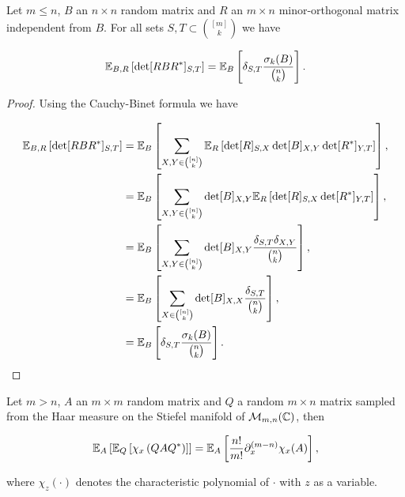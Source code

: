 \begin{lemma} \label{lemma:conjugate_minorth}
    Let $m \le n$, $B$ an $n\times n$ random matrix and $R$ an $m\times n$ minor-orthogonal matrix independent from $B$. For all sets $S,T \subset \binom{[m]}{k}$ we have

    \begin{equation*}
        \mathbb E_{B,R} \left[ \det[RBR^*]_{S,T} \right] = \mathbb E_B \left[\delta_{S,T} \frac{\sigma_k(B)}{\binom{n}k}\right].
    \end{equation*}
\end{lemma}

\begin{proof}
    Using the Cauchy-Binet formula we have

    \begin{align*}
        \mathbb E_{B,R} \left[ \det[RBR^*]_{S,T} \right] &= \mathbb E_B \left[\sum_{X,Y \in \binom{[n]}{k}} \mathbb E_R \left[ \det[R]_{S,X} \det[B]_{X,Y} \det[R^*]_{Y,T} \right] \right],\\ 
        &= \mathbb E_B \left[\sum_{X,Y \in \binom{[n]}{k}} \det[B]_{X,Y} \mathbb E_R \left[ \det[R]_{S,X} \det[R^*]_{Y,T} \right] \right],\\ 
        &= \mathbb E_B \left[\sum_{X,Y \in \binom{[n]}{k}} \det[B]_{X,Y} \frac{\delta_{S,T} \delta_{X,Y}}{\binom{n}{k}} \right],\\ 
        &= \mathbb E_B \left[\sum_{X \in \binom{[n]}{k}} \det [B]_{X,X} \frac{\delta_{S,T}}{\binom{n}{k}} \right],\\
        &= \mathbb E_B \left[\delta_{S,T} \frac{\sigma_k(B)}{\binom{n}k}\right].
    \end{align*}
\end{proof}


\begin{lemma}
    Let $m > n$, $A$ an $m \times m$ random matrix and $Q$ a random $m \times n$ matrix sampled from the Haar measure on the Stiefel manifold of $\mathcal M_{m,n}(\mathbb C)$, then

    \begin{equation*}
        \mathbb E_A \left[ \mathbb E_Q\left[ \chi_x \left( Q A Q^* \right) \right]\right] = \mathbb E_A \left[\frac{n!}{m!} \partial_x^{(m-n)} \chi_x(A) \right],
    \end{equation*}

    \noindent where $\chi_z(\cdot)$ denotes the characteristic polynomial of $\cdot$ with $z$ as a variable.
\end{lemma}

